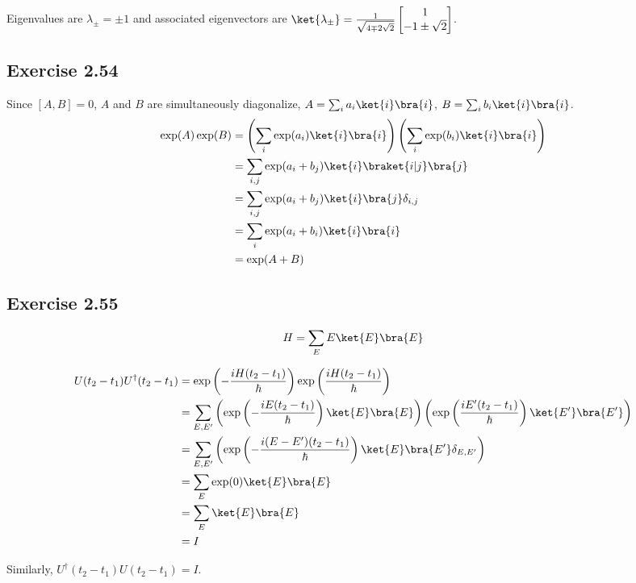 \documentclass[a4paper,12pt]{article}
\begin{document}
Eigenvalues are $\lambda_\pm = \pm 1$ and associated eigenvectors are $\ket{\lambda_\pm} = \frac{1}{\sqrt{4 \mp 2 \sqrt{2}}} \begin{bmatrix}
1 \\
-1 \pm \sqrt{2}
\end{bmatrix} $.




\subsection*{Exercise 2.54}
Since $[A, B] = 0$, $A$ and $B$ are simultaneously diagonalize, $A = \sum_i a_i \ket{i}\bra{i}$, $B = \sum_i b_i \ket{i}\bra{i}$.
\begin{align*}
	\exp (A) \exp (B) &= \left(\sum_i \exp (a_i) \ket{i}\bra{i}\right) \left(\sum_i \exp (b_i) \ket{i}\bra{i}\right) \\
		&= \sum_{i,j} \exp (a_i + b_j) \ket{i} \braket{i | j} \bra{j}\\
		&= \sum_{i,j} \exp (a_i + b_j) \ket{i}\bra{j} \delta_{i, j}\\
		&= \sum_i \exp (a_i +  b_i) \ket{i}\bra{i}\\
		&= \exp (A+B)
\end{align*}


\subsection*{Exercise 2.55}
\begin{align*}
	H = \sum_E E \ket{E}\bra{E}
\end{align*}

\begin{align*}
	U(t_2 - t_1) U^\dagger (t_2 - t_1) &= \exp \left( - \frac{iH(t_2 - t_1)}{\hbar} \right)  \exp \left(  \frac{iH(t_2 - t_1)}{\hbar} \right)\\
		&= \sum_{E, E'} \left(\exp \left(- \frac{iE(t_2 - t_1)}{\hbar} \right) \ket{E}\bra{E} \right)
										\left(\exp \left( \frac{iE'(t_2 - t_1)}{\hbar} \right) \ket{E'}\bra{E'} \right)\\
		&= \sum_{E, E'} \left(\exp \left(- \frac{i(E-E')(t_2 - t_1)}{\hbar} \right) \ket{E}\bra{E'} \delta_{E,E'} \right) \\
		&= \sum_E \exp(0) \ket{E}\bra{E}\\
		&= \sum_E \ket{E}\bra{E}\\
		&= I
\end{align*}

Similarly, $U^\dagger (t_2 - t_1) U (t_2 - t_1) = I$.
\end{document}

